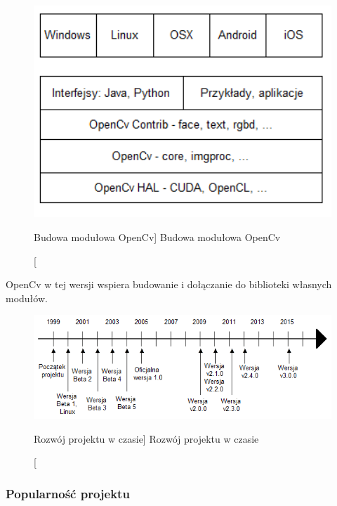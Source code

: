 \documentclass[a4paper,12pt]{article}
\begin{document}
				\begin{figure}[!ht]  
					\begin{center}
						\includegraphics[width=12cm] {image//openCvBudowa.png} 
					\end{center}
					\caption
					    [Budowa modułowa OpenCv]
					    {Budowa modułowa OpenCv}
				\end{figure}

				\par OpenCv w tej wersji wspiera budowanie i dołączanie do biblioteki własnych modułów.
	            \newpage
				\begin{figure}[!ht]   
					\begin{center}
		    				\includegraphics[width=\linewidth] {image//osCzasu.png} 
					\end{center}
					\caption
					    [Rozwój projektu w czasie]  
					    {Rozwój projektu w czasie}  
				\end{figure}


		\subsubsection{Popularność projektu}  
\end{document}
